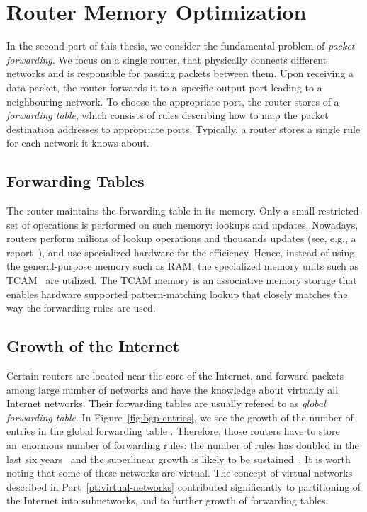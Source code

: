 \section{Router Memory Optimization}
\label{sec:intro-packet-forwarding}


In the second part of this thesis, we consider the fundamental problem of \emph{packet forwarding}.
We focus on a single router, that physically connects different networks and is responsible for passing packets between them.
Upon receiving a data packet, the router forwards it to a~specific output port leading to a neighbouring network.
To choose the appropriate port, the router stores of a \emph{forwarding table}, which consists of rules describing how to map the packet destination addresses to appropriate ports.
Typically, a router stores a single rule for each network it knows about.

\subsection{Forwarding Tables}

The router maintains the forwarding table in its memory.
Only a small restricted set of operations is performed on such memory: lookups and updates.
Nowadays, routers perform milions of lookup operations and thousands updates (see, e.g., a report~\cite{bgp-updates}), and use specialized hardware for the efficiency.
Hence, instead of using the general-purpose memory such as RAM, the specialized memory units such as TCAM~\cite{tcam-memory} are utilized.
The TCAM memory is an associative memory storage that enables hardware supported pattern-matching lookup that closely matches the way the forwarding rules are used.

\subsection{Growth of the Internet}

Certain routers are located near the core of the Internet, and forward packets among large number of networks and have the knowledge about virtually all Internet networks.
Their forwarding tables are usually refered to as \emph{global forwarding table}.
In Figure~\ref{fig:bgp-entries}, we see the growth of the number of entries in the global forwarding table \cite{url-bgp-entries}.
Therefore, those routers have to store an~enormous number of forwarding rules: the
number of rules has doubled in the last six years~\cite{bgp-routeviews} and
the superlinear growth is likely to be sustained~\cite{steve-myth}.
It is worth noting that some of these networks are virtual.
The concept of virtual networks described in Part~\ref{pt:virtual-networks} contributed significantly to partitioning of the Internet into subnetworks, and to further growth of forwarding tables.

